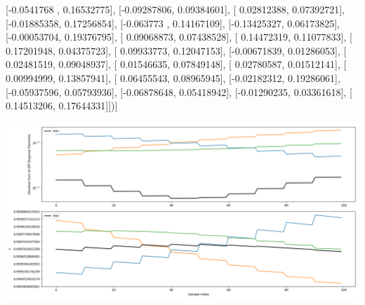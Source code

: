 \documentclass{article}
\begin{document}
       [-0.0541768 ,  0.16532775],
       [-0.09287806,  0.09384601],
       [ 0.02812388,  0.07392721],
       [-0.01885358,  0.17256854],
       [-0.063773  ,  0.14167109],
       [-0.13425327,  0.06173825],
       [-0.00053704,  0.19376795],
       [ 0.09068873,  0.07438528],
       [ 0.14472319,  0.11077833],
       [ 0.17201948,  0.04375723],
       [ 0.09933773,  0.12047153],
       [-0.00671839,  0.01286053],
       [ 0.02481519,  0.09048937],
       [ 0.01546635,  0.07849148],
       [ 0.02780587,  0.01512141],
       [ 0.00994999,  0.13857941],
       [ 0.06455543,  0.08965945],
       [-0.02182312,  0.19286061],
       [-0.05937596,  0.05793936],
       [-0.06878648,  0.05418942],
       [-0.01290235,  0.03361618],
       [ 0.14513206,  0.17644331]])]
\begin{center}
\includegraphics[scale=.9]{report_pickled_controls156/control_dpn_all.png}

\end{center}
\end{document}
